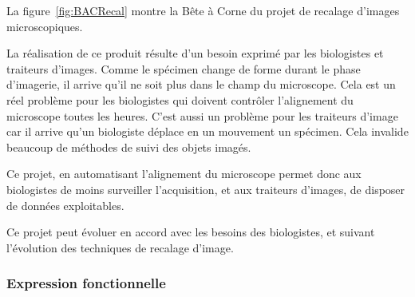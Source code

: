 La figure~\ref{fig:BACRecal} montre la Bête à Corne du projet de recalage d'images microscopiques.

La réalisation de ce produit résulte d'un besoin exprimé par les biologistes et traiteurs d'images.
Comme le spécimen change de forme durant le phase d'imagerie, il arrive qu'il ne soit plus dans le champ du microscope.
Cela est un réel problème pour les biologistes qui doivent contrôler l'alignement du microscope toutes les heures.
C'est aussi un problème pour les traiteurs d'image
car il arrive qu'un biologiste déplace en un mouvement un spécimen.
Cela invalide beaucoup de méthodes de suivi des objets imagés.

Ce projet, en automatisant l'alignement du microscope permet donc aux biologistes de moins surveiller l'acquisition,
et aux traiteurs d'images, de disposer de données exploitables.

Ce projet peut évoluer en accord avec les besoins des biologistes, et suivant l'évolution des techniques de recalage d'image.


\newpage
\subsubsection{Expression fonctionnelle}

